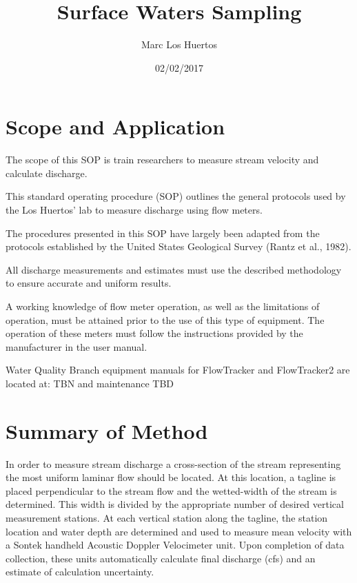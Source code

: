 \documentclass[12pt]{../SOP3_beta}\usepackage[]{graphicx}\usepackage[]{xcolor}
\title{Surface Waters Sampling}
\date{02/02/2017}
\author{Marc Los Huertos}
\begin{document}
\maketitle

\section{Scope and Application}

\NP The scope of this SOP is train researchers to measure stream velocity and calculate discharge.

\NP This standard operating procedure (SOP) outlines the general protocols used by the
Los Huertos' lab to measure discharge using flow meters. 

\NP The
procedures presented in this SOP have largely been adapted from the protocols
established by the United States Geological Survey (Rantz et al., 1982).

\NP All discharge measurements and estimates must use the described methodology to
ensure accurate and uniform results. 

\NP A working knowledge of flow meter operation, as
well as the limitations of operation, must be attained prior to the use of this type of
equipment. The operation of these meters must follow the instructions provided by the
manufacturer in the user manual.

\NP Water Quality Branch equipment manuals for
FlowTracker and FlowTracker2 are located at: TBN %
and maintenance TBD %



\section{Summary of Method}

In order to measure stream discharge a cross-section of the stream representing the
most uniform laminar flow should be located. At this location, a tagline is placed
perpendicular to the stream flow and the wetted-width of the stream is determined.
This width is divided by the appropriate number of desired vertical measurement
stations. At each vertical station along the tagline, the station location and water depth
are determined and used to measure mean velocity with a Sontek handheld Acoustic
Doppler Velocimeter unit. Upon completion of data collection, these units
automatically calculate final discharge (cfs) and an estimate of calculation uncertainty.
\end{document}
